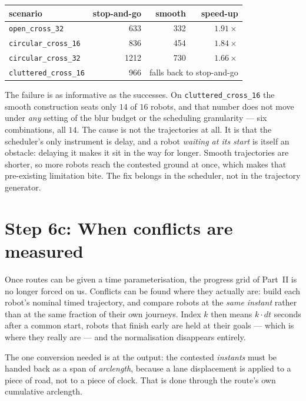 \documentclass[11pt,a4paper]{article}
\begin{document}
\begin{center}
\begin{tabular}{lrrr}
\toprule
scenario & stop-and-go & smooth & speed-up \\
\midrule
\texttt{open\_cross\_32}    & 633  & 332 & $1.91\times$ \\
\texttt{circular\_cross\_16} & 836  & 454 & $1.84\times$ \\
\texttt{circular\_cross\_32} & 1212 & 730 & $1.66\times$ \\
\texttt{cluttered\_cross\_16} & 966 & \multicolumn{2}{l}{falls back to stop-and-go} \\
\bottomrule
\end{tabular}
\end{center}

The failure is as informative as the successes. On \texttt{cluttered\_cross\_16} the smooth
construction seats only $14$ of $16$ robots, and that number does not move under \emph{any}
setting of the blur budget or the scheduling granularity --- six combinations, all $14$. The
cause is not the trajectories at all. It is that the scheduler's only instrument is delay,
and a robot \emph{waiting at its start} is itself an obstacle: delaying it makes it sit in
the way for longer. Smooth trajectories are shorter, so more robots reach the contested
ground at once, which makes that pre-existing limitation bite. The fix belongs in the
scheduler, not in the trajectory generator.

\section{Step 6c: When conflicts are measured}
\label{sec:spacetime}

Once routes can be given a time parameterisation, the progress grid of Part~II is no longer
forced on us. Conflicts can be found where they actually are: build each robot's nominal
timed trajectory, and compare robots at the \emph{same instant} rather than at the same
fraction of their own journeys. Index $k$ then means $k \cdot dt$ seconds after a common
start, robots that finish early are held at their goals --- which is where they really are
--- and the normalisation disappears entirely.

The one conversion needed is at the output: the contested \emph{instants} must be handed
back as a span of \emph{arclength}, because a lane displacement is applied to a piece of
road, not to a piece of clock. That is done through the route's own cumulative arclength.
\end{document}
